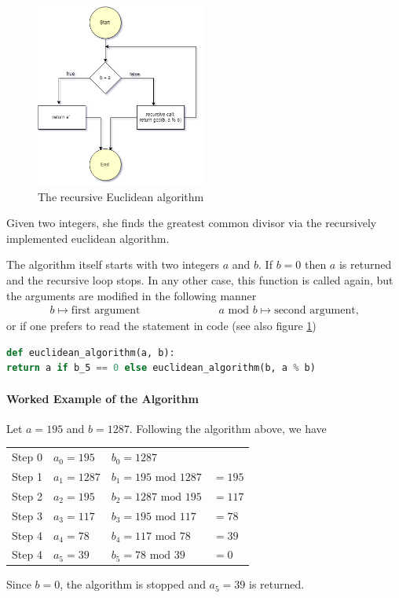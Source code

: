 \documentclass[refman]{scrartcl}
\newcommand{\mymod}{\text{\ \ mod\ \ }}
\begin{document}
\begin{figure}
	\centering
		\includegraphics[width=0.5\textwidth]{graphics/recursive_euclidean_algorithm}
	\caption{The recursive Euclidean algorithm}\label{fig:recursive}
  \end{figure}

Given two integers, she finds the greatest common divisor via the recursively implemented euclidean algorithm.

The algorithm itself starts with two integers \(a\) and \(b\). If \(b = 0\) then \(a\) is returned and the recursive loop stops. In any other case, this function is called again, but the arguments are modified in the following manner
%
\begin{align*}
	b \mapsto \text{first argument} \hspace{3cm} a \mymod b \mapsto \text{second argument} \text{,}
\end{align*}
%
or if one prefers to read the statement in code (see also figure \ref{fig:recursive})
%
\begin{lstlisting}[language=Python]
def euclidean_algorithm(a, b):
return a if b_5 == 0 else euclidean_algorithm(b, a % b)
\end{lstlisting}

\paragraph*{Worked Example of the Algorithm}

Let \(a = 195\) and \(b = 1287\). Following the algorithm above, we have
%
\begin{center}
	\begin{tabular}{ l l l l }
	 Step 0 & \(a_0 = 195\) & \(b_0 = 1287\) & \\ 
	 Step 1 & \(a_1 = 1287\) & \(b_1 = 195 \mymod 1287\) & \(= 195\) \\  
	 Step 2 & \(a_2 = 195\) & \(b_2 = 1287 \mymod 195\) & \(= 117\) \\
	 Step 3 & \(a_3 = 117 \) & \(b_3 = 195 \mymod 117\) & \(= 78\) \\
	 Step 4 & \(a_4 = 78\) & \(b_4 = 117 \mymod 78\) & \(= 39\)\\
	 Step 4 & \(a_5 = 39\) & \(b_5 = 78 \mymod 39\) & \(= 0\)
	\end{tabular}
\end{center}
%
Since \(b = 0\), the algorithm is stopped and \(a_5 = 39\) is returned.
\end{document}
